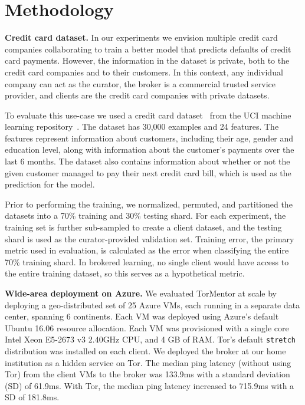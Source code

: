\section{Methodology}
\label{eval:method}

\textbf{Credit card dataset.} In our experiments we envision multiple
credit card companies collaborating to train a better model that
predicts defaults of credit card payments. However, the information in
the dataset is private, both to the credit card companies and to their
customers. In this context, any individual company can act as the
curator, the broker is a commercial trusted service provider, and
clients are the credit card companies with private datasets.

To evaluate this use-case we used a credit card
dataset~\cite{Yeh:2009} from the UCI machine learning
repository~\cite{Lichman:2013}. The dataset has 30,000 examples and
24 features. The features represent information about customers,
including their age, gender and education level, along with
information about the customer's payments over the last 6 months. The
dataset also contains information about whether or not the given
customer managed to pay their next credit card bill, which is used as
the prediction for the model.
 
Prior to performing the training, we normalized, permuted, and
partitioned the datasets into a 70\% training and 30\% testing shard.
For each experiment, the training set is further sub-sampled to create
a client dataset, and the testing shard is used as the
curator-provided validation set. Training error, the primary metric
used in evaluation, is calculated as the error when classifying the
entire 70\% training shard. In brokered learning, no single client
would have access to the entire training dataset, so this serves as a
hypothetical metric.

\textbf{Wide-area deployment on Azure.}  
We evaluated TorMentor at scale by deploying a geo-distributed set of
25 Azure VMs, each running in a separate data center, spanning 6
continents. Each VM was deployed using Azure's
default Ubuntu 16.06 resource allocation. Each VM was provisioned with
a single core Intel Xeon E5-2673 v3 2.40GHz CPU, and 4 GB of RAM.
Tor's default \texttt{stretch} distribution was installed on each client.
We deployed the broker at our home institution as a hidden service on
Tor. The median ping latency (without using Tor) from the client
VMs to the broker was 133.9ms with a standard deviation (SD) of 61.9ms.
With Tor, the median ping latency increased to 715.9ms with a SD of
181.8ms.

